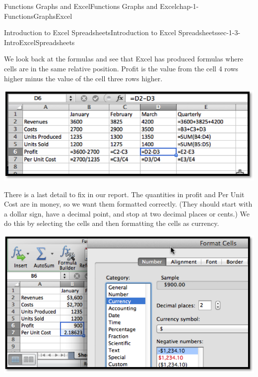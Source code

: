 \documentclass[oneside,10pt,]{book}
\numberwithin{equation}{section}
\begin{document}
\begin{chapterptx}{Functions Graphs and Excel}{}{Functions Graphs and Excel}{}{}{chap-1-FunctionsGraphsExcel}
\begin{sectionptx}{Introduction to Excel Spreadsheets}{}{Introduction to Excel Spreadsheets}{}{}{sec-1-3-IntroExcelSpreadsheets}
\begin{sidebyside}{1}{0.1}{0.1}{0}
\begin{sbspanel}{0.8}
\end{sbspanel}%
\end{sidebyside}%
\par
\hypertarget{p-244}{}%
We look back at the formulas and see that Excel has produced formulas where cells are in the same relative position.  Profit is the value from the cell 4 rows higher minus the value of the cell three rows higher.%
\begin{sidebyside}{1}{0.1}{0.1}{0}%
\begin{sbspanel}{0.8}%
\includegraphics[width=1\linewidth]{images/sec1-3-7MoreSums.png}
\end{sbspanel}%
\end{sidebyside}%
\par
\hypertarget{p-245}{}%
There is a last detail to fix in our report.  The quantities in profit and Per Unit Cost are in money, so we want them formatted correctly.  (They should start with a dollar sign, have a decimal point, and stop at two decimal places or cents.)  We do this by selecting the cells and then formatting the cells as currency.%
\begin{sidebyside}{1}{0.1}{0.1}{0}%
\begin{sbspanel}{0.8}%
\includegraphics[width=1\linewidth]{images/sec1-3-8.png}
\end{sbspanel}%
\end{sidebyside}%

\end{sectionptx}
\end{chapterptx}
\end{document}
